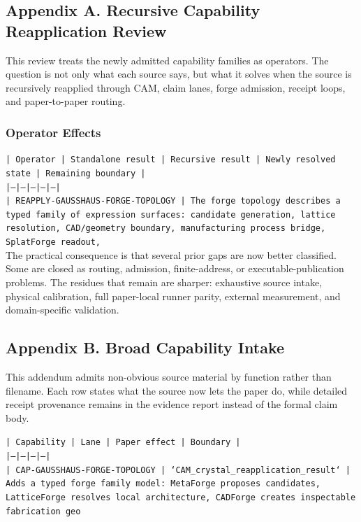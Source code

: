 \documentclass[11pt]{article}
\begin{document}
\subsection*{Appendix A. Recursive Capability Reapplication Review}

This review treats the newly admitted capability families as operators. The question is not only what each source says, but what it solves when the source is recursively reapplied through CAM, claim lanes, forge admission, receipt loops, and paper-to-paper routing.

\subsubsection*{Operator Effects}

\noindent\texttt{| Operator | Standalone result | Recursive result | Newly resolved state | Remaining boundary |}\\
\noindent\texttt{|---|---|---|---|---|}\\
\noindent\texttt{| REAPPLY-GAUSSHAUS-FORGE-TOPOLOGY | The forge topology describes a typed family of expression surfaces: candidate generation, lattice resolution, CAD/geometry boundary, manufacturing process bridge, SplatForge readout, }\\

The practical consequence is that several prior gaps are now better classified. Some are closed as routing, admission, finite-address, or executable-publication problems. The residues that remain are sharper: exhaustive source intake, physical calibration, full paper-local runner parity, external measurement, and domain-specific validation.

\subsection*{Appendix B. Broad Capability Intake}

This addendum admits non-obvious source material by function rather than filename. Each row states what the source now lets the paper do, while detailed receipt provenance remains in the evidence report instead of the formal claim body.

\noindent\texttt{| Capability | Lane | Paper effect | Boundary |}\\
\noindent\texttt{|---|---|---|---|}\\
\noindent\texttt{| CAP-GAUSSHAUS-FORGE-TOPOLOGY | `CAM\_crystal\_reapplication\_result` | Adds a typed forge family model: MetaForge proposes candidates, LatticeForge resolves local architecture, CADForge creates inspectable fabrication geo}\\
\end{document}
